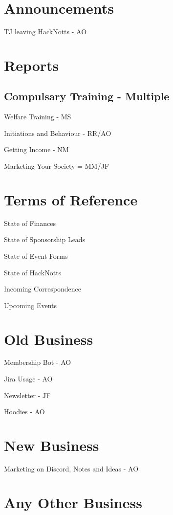 \documentclass[11pt,hacksoc,agenda]{meetingmins}
\begin{document}
\maketitle

\section{Announcements}
\begin{items}
\item TJ leaving HackNotts - AO
\end{items}

\section{Reports}
\subsection{Compulsary Training - Multiple}
\begin{hiddensubitems}
\item Welfare Training - MS
\item Initiations and Behaviour - RR/AO
\item Getting Income - NM
\item Marketing Your Society = MM/JF
\end{hiddensubitems}

\section{Terms of Reference}
\begin{items}
\item {State of Finances}
\item {State of Sponsorship Leads}
\item {State of Event Forms}
\item {State of HackNotts}
\item {Incoming Correspondence}
\item {Upcoming Events}
\end{items}

\section{Old Business}
\begin{items}
\item Membership Bot - AO
\item Jira Usage - AO
\item Newsletter - JF
\item Hoodies - AO
\end{items}

\section{New Business}
\begin{items}
\item Marketing on Discord, Notes and Ideas - AO
\end{items}

\section{Any Other Business}

\vspace{1em}
\end{document}
